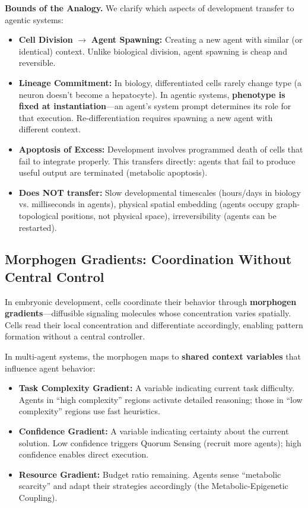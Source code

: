 \textbf{Bounds of the Analogy.} We clarify which aspects of development transfer to agentic systems:
\begin{itemize}[leftmargin=*]
\item \textbf{Cell Division} $\to$ \textbf{Agent Spawning:} Creating a new agent with similar (or identical)
context. Unlike biological division, agent spawning is cheap and reversible.
\item \textbf{Lineage Commitment:} In biology, differentiated cells rarely change type (a neuron doesn't become
a hepatocyte). In agentic systems, \textbf{phenotype is fixed at instantiation}---an agent's system prompt
determines its role for that execution. Re-differentiation requires spawning a new agent with different context.
\item \textbf{Apoptosis of Excess:} Development involves programmed death of cells that fail to integrate properly.
This transfers directly: agents that fail to produce useful output are terminated (metabolic apoptosis).
\item \textbf{Does NOT transfer:} Slow developmental timescales (hours/days in biology vs. milliseconds in agents),
physical spatial embedding (agents occupy graph-topological positions, not physical space), irreversibility (agents can be restarted).
\end{itemize}

\subsection{Morphogen Gradients: Coordination Without Central Control}

In embryonic development, cells coordinate their behavior through \textbf{morphogen gradients}---diffusible
signaling molecules whose concentration varies spatially. Cells read their local concentration and differentiate
accordingly, enabling pattern formation without a central controller.

In multi-agent systems, the morphogen maps to \textbf{shared context variables} that influence agent behavior:
\begin{itemize}[leftmargin=*]
\item \textbf{Task Complexity Gradient:} A variable indicating current task difficulty. Agents in ``high
complexity'' regions activate detailed reasoning; those in ``low complexity'' regions use fast heuristics.
\item \textbf{Confidence Gradient:} A variable indicating certainty about the current solution. Low confidence
triggers Quorum Sensing (recruit more agents); high confidence enables direct execution.
\item \textbf{Resource Gradient:} Budget ratio remaining. Agents sense ``metabolic scarcity'' and adapt their
strategies accordingly (the Metabolic-Epigenetic Coupling).
\end{itemize}

